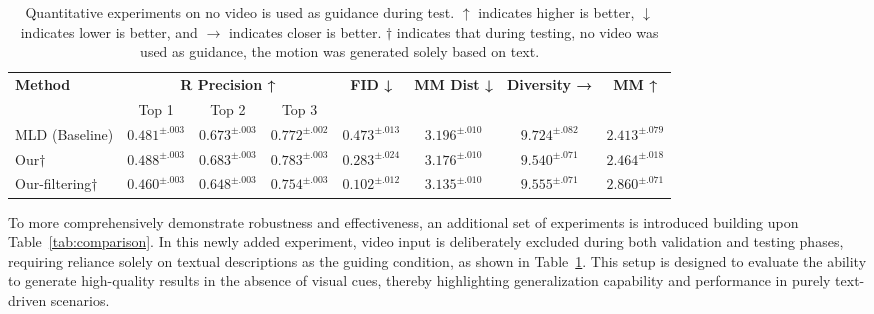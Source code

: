 \documentclass[a4paper,12pt]{article}
\begin{document}
\begin{table}[t]
\centering
\scriptsize
\setlength{\tabcolsep}{2.5pt}
\renewcommand{\arraystretch}{1}
\begin{tabular}{l|ccc|c|c|c|c}
\toprule
\multirow{2}{*}{\textbf{Method}} & \multicolumn{3}{c|}{\textbf{R Precision ↑}} & \multirow{2}{*}{\textbf{FID ↓}} & \multirow{2}{*}{\textbf{MM Dist ↓}} & \multirow{2}{*}{\textbf{Diversity →}} & \multirow{2}{*}{\textbf{MM ↑}} \\
 & Top 1 & Top 2 & Top 3 &  &  &  & \\
\midrule

MLD (Baseline)   & $0.481^{\pm.003}$ & $0.673^{\pm.003}$ & $0.772^{\pm.002}$ & $0.473^{\pm.013}$ & $3.196^{\pm.010}$ & $9.724^{\pm.082}$ & $2.413^{\pm.079}$ \\ 
Our$\dag$     & $0.488^{\pm.003}$ & $0.683^{\pm.003}$ & $0.783^{\pm.003}$ & $0.283^{\pm.024}$ & $3.176^{\pm.010}$ & $9.540^{\pm.071}$ & $2.464^{\pm.018}$ \\ 
Our-filtering$\dag$    & $0.460^{\pm.003}$ & $0.648^{\pm.003}$ & $0.754^{\pm.003}$ & $0.102^{\pm.012}$ & $3.135^{\pm.010}$ & $9.555^{\pm.071}$ & $2.860^{\pm.071}$ \\

\bottomrule
\hline
\end{tabular}
\caption{Quantitative experiments on no video is used as guidance during test. 
$\uparrow$ indicates higher is better, $\downarrow$ indicates lower is better, and $\rightarrow$ indicates closer is better. $\dag$ indicates that during testing, no video was used as guidance, the motion was generated solely based on text. 
}
\label{tab:comparison_without_video}
\end{table}

To more comprehensively demonstrate robustness and effectiveness, an additional set of experiments is introduced building upon Table~\ref{tab:comparison}. In this newly added experiment, video input is deliberately excluded during both validation and testing phases, requiring reliance solely on textual descriptions as the guiding condition, as shown in Table~\ref{tab:comparison_without_video}. This setup is designed to evaluate the ability to generate high-quality results in the absence of visual cues, thereby highlighting generalization capability and performance in purely text-driven scenarios.
\end{document}
